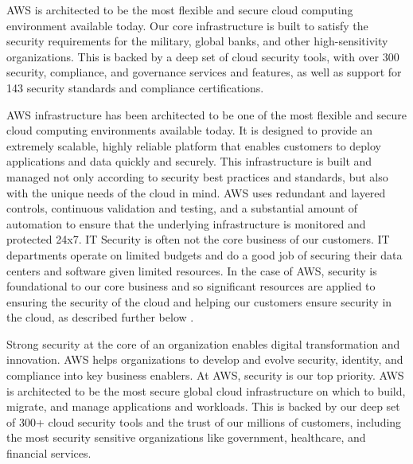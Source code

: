 AWS is architected to be the most flexible and secure cloud computing environment available today. Our core infrastructure is built to satisfy the security requirements for the military, global banks, and other high-sensitivity organizations. This is backed by a deep set of cloud security tools, with over 300 security, compliance, and governance services and features, as well as support for 143 security standards and compliance certifications.

AWS infrastructure has been architected to be one of the most flexible and secure cloud computing environments available today. It is designed to provide an extremely scalable, highly reliable platform that enables customers to deploy applications and data quickly and securely. This infrastructure is built and managed not only according to security best practices and standards, but also with the unique needs of the cloud in mind. AWS uses redundant and layered controls, continuous validation and testing, and a substantial amount of automation to ensure that the underlying infrastructure is monitored and protected 24x7. IT Security is often not the core business of our customers. IT departments operate on limited budgets and do a good job of securing their data centers and software given limited resources. In the case of AWS, security is foundational to our core business and so significant resources are applied to ensuring the security of the cloud and helping our customers ensure security in the cloud, as described further below \cite{AWSCloudComputing}. 

Strong security at the core of an organization enables digital transformation and innovation. AWS helps organizations to develop and evolve security, identity, and compliance into key business enablers. At AWS, security is our top priority. AWS is architected to be the most secure global cloud infrastructure on which to build, migrate, and manage applications and workloads. This is backed by our deep set of 300+ cloud security tools and the trust of our millions of customers, including the most security sensitive organizations like government, healthcare, and financial services.

